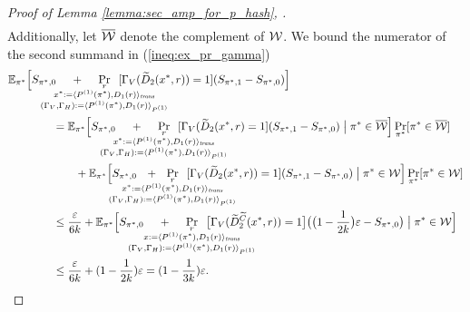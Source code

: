 \begin{proof}[Proof of Lemma \ref{lemma:sec_amp_for_p_hash}, \cite{holenstein2011general}]
\begin{align}
\end{align}
Additionally, let $\overline{\mathcal{W}}$ denote the complement of $\mathcal{W}$.
We bound the numerator of the second summand in (\ref{ineq:ex_pr_gamma})
\begin{align}
  \label{ineq:second_eq}
&\mathbb{E}_{\pi^*}\Big[ S_{\pi^*,0}
\mkern23mu
+
\mkern23mu
\underset{
  \mathclap{
  \substack{r \\ x^* := \langle P^{(1)}(\pi^*), D_1(r) \rangle_{\mathit{trans}}
    \\ (\Gamma_V, \Gamma_H) := \langle P^{(1)}(\pi^*), D_1 (r) \rangle_{P^{(1)}} }}}
{\Pr}\mkern13mu[\Gamma_V(\widetilde{D}_2(x^*, r)) = 1]
(S_{\pi^*,1} - S_{\pi^*,0})\Big] \notag\\
%
&\IndII = \mathbb{E}_{\pi^*}\Bigl[ S_{\pi^*,0}
\mkern23mu + \mkern23mu
\underset{
  \mathclap{
  \substack{r \\ x^* := \langle P^{(1)}(\pi^*), D_1(r) \rangle_{\mathit{trans}}
    \\ (\Gamma_V, \Gamma_H) := \langle P^{(1)}(\pi^*), D_1 (r) \rangle_{P^{(1)}} }}}
{\Pr}\mkern13mu[\Gamma_V(\widetilde{D}_2(x^*, r) = 1]
  (S_{\pi^*,1} - S_{\pi^*,0}) \bigm| \pi^* \in \overline{\cW}\Bigr] \Pr_{\pi^*}[\pi^* \in \overline{\cW}]\notag\\
&\IndIII +  \mathbb{E}_{\pi^*}\Bigl[ S_{\pi^*,0} \mkern13mu + \mkern13mu
\underset{
  \mathclap{
  \substack{r \\ x^* := \langle P^{(1)}(\pi^*), D_1(r) \rangle_{\mathit{trans}}
    \\ (\Gamma_V, \Gamma_H) := \langle P^{(1)}(\pi^*), D_1 (r) \rangle_{P^{(1)}} }}}
{\Pr}\mkern13mu[\Gamma_V(\widetilde{D}_2(x^*, r)) = 1]
(S_{\pi^*,1} - S_{\pi^*,0})  \bigm| \pi^* \in \cW\Bigr] \Pr_{\pi^*}[\pi^* \in \cW] \notag\\
&\IndII \leq \frac{\epsilon}{6k} + \mathbb{E}_{\pi^*}\Bigl[ S_{\pi^*,0} \mkern23mu + \mkern23mu
\underset{
  \mathclap{
  \substack{r \\ x := \langle P^{(1)}(\pi^*), D_1(r) \rangle_{\mathit{trans}}
    \\ (\Gamma_V, \Gamma_H) := \langle P^{(1)}(\pi^*), D_1 (r) \rangle_{P^{(1)}} }}}
{\Pr}\mkern13mu\big[\Gamma_V(\widetilde{D}_2^{\widetilde{C}}(x^*, r)) = 1\big]
\big(\bigl(1 - \frac{1}{2k}\bigr)\epsilon - S_{\pi^*,0}\big)  \bigm| \pi^* \in \cW \Bigr] \notag\\
&\IndII \leq \frac{\epsilon}{6k} + (1 - \frac{1}{2k})\epsilon = (1 - \frac{1}{3k}) \epsilon.
\end{align}

\end{proof}
